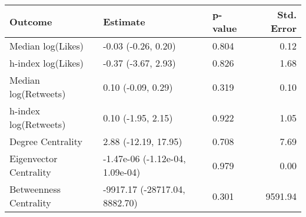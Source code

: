 \begin{table}[ht]
\centering
\begin{tabular}{lllr}
  \hline
Outcome & Estimate & p-value & Std. Error \\ 
  \hline
Median log(Likes) & -0.03 (-0.26, 0.20) & 0.804 & 0.12 \\ 
  h-index log(Likes) & -0.37 (-3.67, 2.93) & 0.826 & 1.68 \\ 
  Median log(Retweets) & 0.10 (-0.09, 0.29) & 0.319 & 0.10 \\ 
  h-index log(Retweets) & 0.10 (-1.95, 2.15) & 0.922 & 1.05 \\ 
  Degree Centrality & 2.88 (-12.19, 17.95) & 0.708 & 7.69 \\ 
  Eigenvector Centrality & -1.47e-06 (-1.12e-04, 1.09e-04) & 0.979 & 0.00 \\ 
  Betweenness Centrality & -9917.17 (-28717.04, 8882.70) & 0.301 & 9591.94 \\ 
   \hline
\end{tabular}
\end{table}
